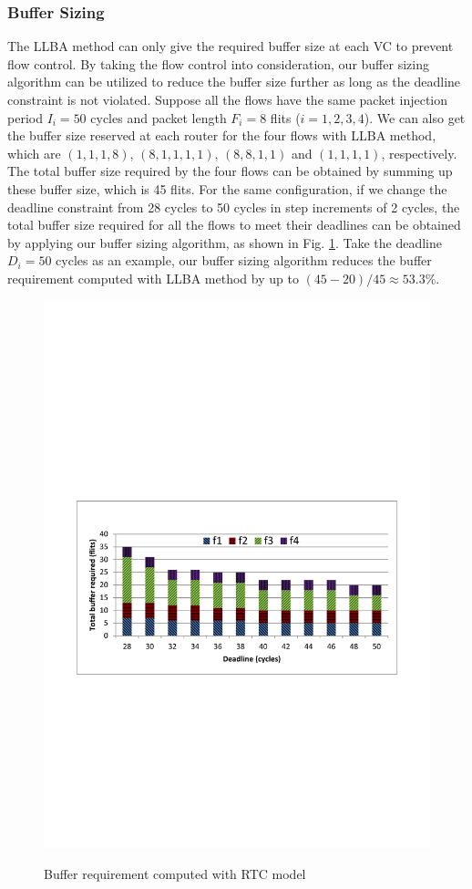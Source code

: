 \documentclass[preprint]{elsarticle}
\begin{document}
\subsubsection{Buffer Sizing}
The LLBA method \cite{189} can only give the required buffer size at each VC to prevent flow control. By taking the flow control into consideration, our buffer sizing algorithm can be utilized to reduce the buffer size further as long as the deadline constraint is not violated. Suppose all the flows have the same packet injection period $I_i=50$ cycles and packet length $F_i=8$ flits ($i=1,2,3,4$). We can also get the buffer size reserved at each router for the four flows with LLBA method, which are $(1,1,1,8)$, $(8,1,1,1,1)$, $(8,8,1,1)$ and $(1,1,1,1)$, respectively. The total buffer size required by the four flows can be obtained by summing up these buffer size, which is 45 flits. For the same configuration, if we change the deadline constraint from 28 cycles to 50 cycles in step increments of 2 cycles, the total buffer size required for all the flows to meet their deadlines can be obtained by applying our buffer sizing algorithm, as shown in Fig. \ref{LLBAvsRTC}. Take the deadline $D_i=50$ cycles as an example, our buffer sizing algorithm reduces the buffer requirement computed with LLBA method by up to $(45-20)/45\approx53.3$\%.
\begin{figure}
  \centering
  \includegraphics[scale=0.6]{figures/bufopt.pdf}\\
  \caption{Buffer requirement computed with RTC model}\label{LLBAvsRTC}
\end{figure}
\end{document}
